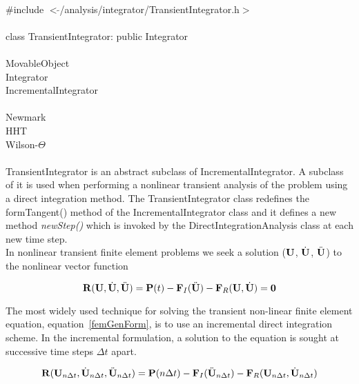 
   \\
\indent \#include $<\tilde{ }$/analysis/integrator/TransientIntegrator.h$>$  \\

  \\
\indent class TransientIntegrator: public Integrator  \\

 \\
\indent MovableObject \\
\indent\indent Integrator \\
\indent\indent\indent IncrementalIntegrator \\
\indent\indent\indent{} \\
\indent\indent\indent\indent\indent Newmark \\
\indent\indent\indent\indent\indent HHT \\
\indent\indent\indent\indent\indent Wilson-$\Theta$ \\

 \\ 
\indent TransientIntegrator is an abstract subclass of IncrementalIntegrator.
A subclass of it is used when performing a nonlinear transient
analysis of the problem using a direct integration method. The
TransientIntegrator class redefines the formTangent() method of
the IncrementalIntegrator class and it defines a new method {\em
newStep()} which is invoked by the DirectIntegrationAnalysis class at
each new time step.  \\

In nonlinear transient finite element problems we seek a solution
(${\bf U}$, $\dot {{\bf U}}$, $\ddot {{\bf U}}$) to the nonlinear vector function

\begin{equation}
{\bf R}({\bf U},\dot{\bf U}, \ddot{\bf U}) = {\bf P}(t) - {\bf F}_I(\ddot{\bf U}) - {\bf F}_R({\bf U}, \dot{\bf U}) = {\bf 0}
\label{femGenForm}
\end{equation}


The most widely used technique for solving the transient non-linear 
finite element equation, equation~\ref{femGenForm}, is to use an
incremental direct integration scheme. In the incremental formulation,
a solution to the equation is sought at successive time steps $\Delta
t$ apart.  

\begin{equation}
{\bf R}({\bf U}_{n \Delta t},\dot{\bf U}_{n \Delta t}, \ddot{\bf U}_{n \Delta t}) = {\bf P}(n \Delta t) -
{\bf F}_I(\ddot{\bf U}_{n \Delta t}) - {\bf F}_R({\bf U}_{n \Delta t}, \dot{\bf U}_{n \Delta t})
\label{fullTimeForm}
\end{equation}


